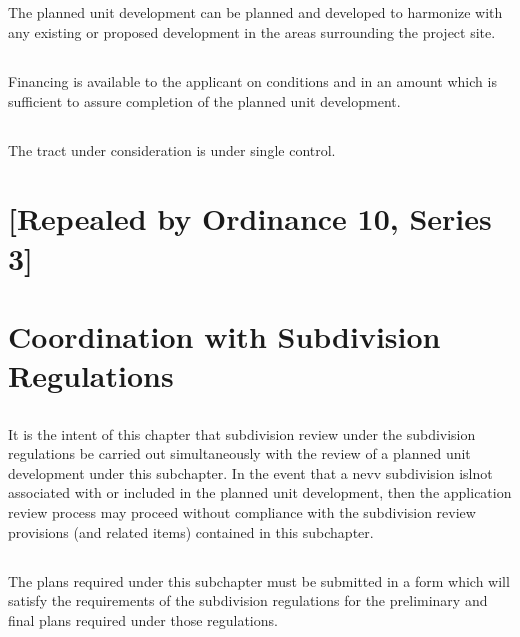 \subsection{}
The planned unit development can be planned and developed to harmonize with any existing or proposed development in the areas surrounding the project site.
\subsection{}
Financing is available to the applicant on conditions and in an amount which is sufficient to assure completion of the planned unit development.
\subsection{}
The tract under consideration is under single control.

\section{[Repealed by Ordinance 10, Series 3]}

\section{Coordination with Subdivision Regulations}
\subsection{}
It is the intent of this chapter that subdivision review under the subdivision regulations be carried out simultaneously with the review of a planned unit development under this subchapter. In the event that a nevv subdivision islnot associated with or included in the planned unit development, then the application review process may proceed without compliance with the subdivision review provisions (and related items) contained in this subchapter.
\subsection{}
The plans required under this subchapter must be submitted in a form which will satisfy the requirements of the subdivision regulations for the preliminary and final plans required under those regulations.

